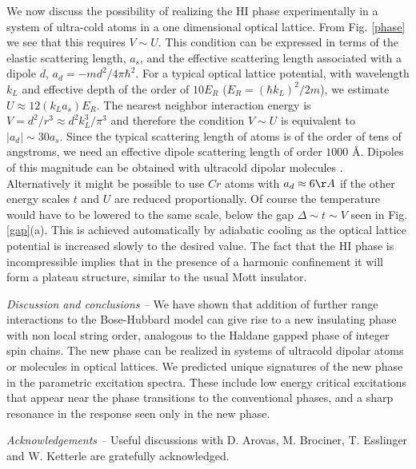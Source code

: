 \documentclass[prb,twocolumn,,amsmath,amssymb,floatfix]{revtex4}
\def \D{{\Delta}}
\begin{document}
We now discuss the possibility of realizing the HI phase
experimentally in a system of ultra-cold atoms in a one
dimensional optical lattice. From Fig. \ref{phase} we see that this
requires $V\sim U$. This condition can be expressed in terms of the
elastic scattering length, $a_s$, and the effective scattering
length associated with a dipole $d$, $a_d=- m d^2 / 4\pi \hbar^2$.
For a typical optical lattice potential, with wavelength $k_L$ and effective
depth of the order of $10E_R$ ($E_R = (\hbar
k_L)^2 / 2m$), we estimate\cite{jaksch} $U \approx 12 (k_L a_s) E_R$.
The nearest neighbor interaction energy is $V = d^2/ r^3 \approx d^2
k_L^3 / \pi^3$ and therefore the condition $V \sim U$ is equivalent
to $|a_d| \sim 30 a_s$. Since the typical scattering length of atoms
is of the order of tens of angstroms, we need an effective dipole
scattering length of order $1000$ \AA.
Dipoles of this magnitude can be obtained with ultracold
dipolar molecules \cite{baranov}.
Alternatively it might be possible to use $Cr$ atoms with $a_d\approx 6 \AA$ if
the other energy scales $t$ and $U$ are reduced proportionally. Of course the temperature
would have to be lowered to the same scale, below the gap $\D\sim t\sim V$ seen in Fig. \ref{gap}(a).
This is achieved automatically by adiabatic
cooling as the optical lattice potential is increased slowly to the desired value.
The fact that the HI phase is incompressible implies that in the
presence of a harmonic confinement it will form a plateau structure,
similar to the usual Mott insulator.

{\em Discussion and conclusions --} We have shown that addition of
further range interactions to the Bose-Hubbard model can give rise
to a new insulating phase with non local string order, analogous to
the Haldane gapped phase of integer spin chains. The new phase can
be realized in systems of ultracold dipolar atoms or molecules in
optical lattices. We predicted unique signatures
of the new phase in the parametric excitation spectra.
These include low energy critical excitations
that appear near the phase transitions to the conventional phases,
and a sharp resonance in the response seen only in the new phase.

{\em Acknowledgements --} Useful discussions with D. Arovas, M. Brociner, T.
Esslinger and W. Ketterle are gratefully acknowledged.
\end{document}
